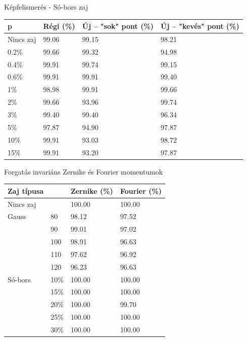 \documentclass{beamer}
\begin{document}
\begin{frame}{Képfelismerés - Só-bors zaj}
    \vskip 1cm
    \begin{table}[tbp]
        \centering
        \begin{tabular}{|p{1.5cm}|p{1.5cm}|p{1.8cm}|p{2cm}|} \hline
            p & \textbf{Régi} (\%) & \textbf{Új} -- "sok" pont (\%)& \textbf{Új} -- "kevés" pont (\%) \\ \hline\hline
            Nincs zaj & 99.06 & 99.15 & 98.21 \\ \hline
            0.2\% & 99.66 & 99.32 & 94.98 \\ \hline
            0.4\% & 99.91 & 99.74 & 99.15 \\ \hline
            0.6\% & 99.91 & 99.91 & 99.40 \\ \hline
            1\% & 98.98 & 99.91 & 99.66 \\ \hline
            2\% & 99.66 & 93.96 & 99.74 \\ \hline
            3\% & 99.40 & 99.40 & 96.34 \\ \hline
            5\% & 97.87 & 94.90 & 97.87 \\ \hline
            10\% & 99.91 & 93.03 & 98.72 \\ \hline
            15\% & 99.91 & 93.20 & 97.87 \\ \hline
        \end{tabular}
    \end{table}
\end{frame}

\begin{frame}{Forgatás invariáns Zernike és Fourier momentumok}
    \vskip 1cm
    \begin{table}[tbp]
        \centering
        \begin{tabular}{|p{2cm}|p{1.5cm}|p{2.2cm}<{\raggedright}|p{2cm}|} \hline
            \textbf{Zaj típusa} & & \textbf{Zernike} (\%) & \textbf{Fourier} (\%) \\ \hline\hline
            Nincs zaj & & 100.00 & 100.00 \\ \hline\hline
            Gauss & 80 & 98.12 & 97.52 \\ \cline{2-4}
            & 90 & 99.01 & 97.02 \\ \cline{2-4}
            & 100 & 98.91 & 96.63 \\ \cline{2-4}
            & 110 & 97.62 & 96.92 \\ \cline{2-4}
            & 120 & 96.23 & 96.63 \\ \hline\hline
            Só-bors & 10\% & 100.00 & 100.00 \\ \cline{2-4}
            & 15\% & 100.00 & 100.00 \\ \cline{2-4}
            & 20\% & 100.00 & 99.70 \\ \cline{2-4}
            & 25\% & 100.00 & 100.00 \\ \cline{2-4}
            & 30\% & 100.00 & 100.00 \\ \cline{1-4}
        \end{tabular}
    \end{table}
\end{frame}
\end{document}

